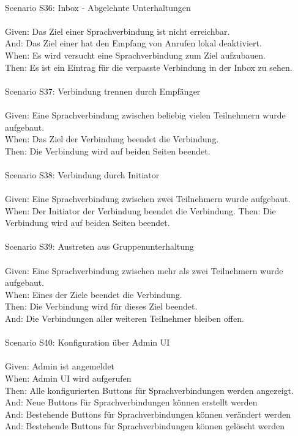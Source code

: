 \begin{tabbing}
    \\
    Scenario S36: \> \> \> Inbox - Abgelehnte Unterhaltungen \\ \\
    Given:  \> \> \> Das Ziel einer Sprachverbindung ist nicht erreichbar. \\
    And:  \> \> \> Das Ziel einer hat den Empfang von Anrufen lokal deaktiviert. \\
    When:   \> \> \> Es wird versucht eine Sprachverbindung zum Ziel aufzubauen.\\
    Then:   \> \> \> Es ist ein Eintrag für die verpasste Verbindung in der Inbox zu sehen.\\
    \\
    Scenario S37: \> \> \> Verbindung trennen durch Empfänger \\ \\
    Given:  \> \> \> Eine Sprachverbindung zwischen beliebig vielen Teilnehmern wurde aufgebaut. \\
    When:   \> \> \> Das Ziel der Verbindung beendet die Verbindung. \\
    Then:   \> \> \> Die Verbindung wird auf beiden Seiten beendet.\\
    \\
    Scenario S38: \> \> \> Verbindung durch Initiator \\ \\
    Given:  \> \> \> Eine Sprachverbindung zwischen zwei Teilnehmern wurde aufgebaut. \\
    When:   \> \> \> Der Initiator der Verbindung beendet die Verbindung.
    Then:   \> \> \> Die Verbindung wird auf beiden Seiten beendet.\\
    \\
    Scenario S39: \> \> \> Austreten aus Gruppenunterhaltung \\ \\
    Given:  \> \> \> Eine Sprachverbindung zwischen mehr als zwei Teilnehmern wurde aufgebaut. \\
    When:   \> \> \> Eines der Ziele beendet die Verbindung. \\
    Then:   \> \> \> Die Verbindung wird für dieses Ziel beendet.\\
    And:   \> \> \> Die Verbindungen aller weiteren Teilnehmer bleiben offen.\\
    \\
    Scenario S40: \> \> \> Konfiguration über Admin UI \\ \\
    Given: \> \> \>  Admin ist angemeldet\\
    When: \> \> \>  Admin UI wird aufgerufen\\
    Then: \> \> \>  Alle konfigurierten Buttons für Sprachverbindungen werden angezeigt.\\
    And: \> \> \>  Neue Buttons für Sprachverbindungen können erstellt werden\\
    And: \> \> \>  Bestehende Buttons für Sprachverbindungen können verändert werden\\
    And: \> \> \>  Bestehende Buttons für Sprachverbindungen können gelöscht werden\\
    \\
\end{tabbing}
\clearpage
